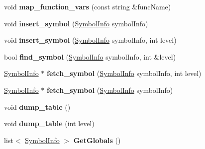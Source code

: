 \begin{DoxyCompactItemize}
\item 
\hypertarget{classSymTab_aaca51de0935bbdbf3fdf434deccccb92}{void {\bfseries map\-\_\-function\-\_\-vars} (const string \&func\-Name)}\label{classSymTab_aaca51de0935bbdbf3fdf434deccccb92}

\item 
\hypertarget{classSymTab_ad8e59e29c50f039570c5844871bf838c}{void {\bfseries insert\-\_\-symbol} (\hyperlink{structSymbolInfo}{Symbol\-Info} symbol\-Info)}\label{classSymTab_ad8e59e29c50f039570c5844871bf838c}

\item 
\hypertarget{classSymTab_a8372047f573c6d84fa231aa7e9842280}{void {\bfseries insert\-\_\-symbol} (\hyperlink{structSymbolInfo}{Symbol\-Info} symbol\-Info, int level)}\label{classSymTab_a8372047f573c6d84fa231aa7e9842280}

\item 
\hypertarget{classSymTab_a2aedd91e00780c889e60a60fc0795daf}{bool {\bfseries find\-\_\-symbol} (\hyperlink{structSymbolInfo}{Symbol\-Info} symbol\-Info, int \&level)}\label{classSymTab_a2aedd91e00780c889e60a60fc0795daf}

\item 
\hypertarget{classSymTab_ac0bfd9c56cfd8e697046178629adbebc}{\hyperlink{structSymbolInfo}{Symbol\-Info} $\ast$ {\bfseries fetch\-\_\-symbol} (\hyperlink{structSymbolInfo}{Symbol\-Info} symbol\-Info, int level)}\label{classSymTab_ac0bfd9c56cfd8e697046178629adbebc}

\item 
\hypertarget{classSymTab_aa977139826a1cdf093078e0527ed1ab3}{\hyperlink{structSymbolInfo}{Symbol\-Info} $\ast$ {\bfseries fetch\-\_\-symbol} (\hyperlink{structSymbolInfo}{Symbol\-Info} symbol\-Info)}\label{classSymTab_aa977139826a1cdf093078e0527ed1ab3}

\item 
\hypertarget{classSymTab_ab4c005eb114053be22fdbe315542f55b}{void {\bfseries dump\-\_\-table} ()}\label{classSymTab_ab4c005eb114053be22fdbe315542f55b}

\item 
\hypertarget{classSymTab_ad5d45136f341bf024a226fe600fb4dcc}{void {\bfseries dump\-\_\-table} (int level)}\label{classSymTab_ad5d45136f341bf024a226fe600fb4dcc}

\item 
\hypertarget{classSymTab_aced837e720830dd9ccb2d3dde621d489}{list$<$ \hyperlink{structSymbolInfo}{Symbol\-Info} $>$ {\bfseries Get\-Globals} ()}\label{classSymTab_aced837e720830dd9ccb2d3dde621d489}


\end{DoxyCompactItemize}
